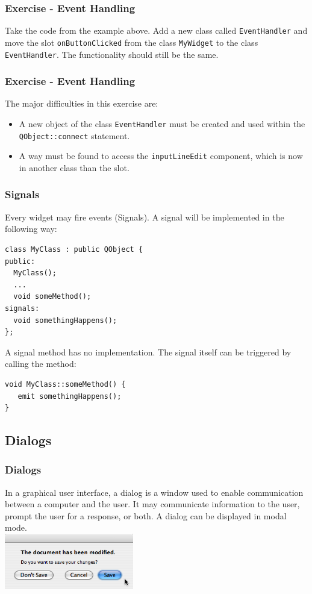 \begin{frame}[fragile]
	\frametitle{Exercise - Event Handling}
	Take the code from the example above. Add a new class called \verb|EventHandler|
	and move the slot \verb|onButtonClicked| from the class \verb|MyWidget| to the
	class \verb|EventHandler|. The functionality should still be the same.
\end{frame}

\begin{frame}[fragile]
	\frametitle{Exercise - Event Handling}
	The major difficulties in this exercise are:
	\begin{itemize}
	\item A new object of the class \verb|EventHandler| must be created and used
	within the \verb|QObject::connect| statement.
	\item A way must be found to access the \verb|inputLineEdit| component, which
	is now in another class than the slot.
	\end{itemize}
\end{frame}

\begin{frame}[fragile]
\frametitle{Signals}
Every widget may fire events (Signals). A signal will be implemented
in the following way:

{\small
\begin{lstlisting}
class MyClass : public QObject {
public:
  MyClass();
  ...
  void someMethod();
signals:
  void somethingHappens();
};
\end{lstlisting}
}
A signal method has no implementation. The signal itself can be
triggered by calling the method:

{\small
\begin{lstlisting}
void MyClass::someMethod() {
   emit somethingHappens();
}
\end{lstlisting}
}

\end{frame}

\subsection{Dialogs}
\begin{frame}[fragile]
\frametitle{Dialogs}
In a graphical user interface, a dialog is a window used to enable communication between
a computer and the user. It may communicate information to the user, prompt the user for
a response, or both. A dialog can be displayed in modal mode.\\
\vspace{3mm}
\includegraphics[width=160pt]{img/dialog1.png} 
\end{frame}

